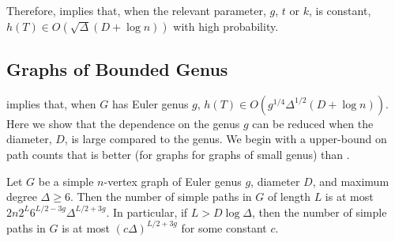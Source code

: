 \documentclass[lotsofwhite]{patmorin}
\begin{document}
Therefore,  implies that,
when the relevant parameter, $g$, $t$ or $k$, is constant, $h(T)\in
O(\sqrt{\Delta}(D+\log n))$ with high probability.  



\subsection{Graphs of Bounded Genus}

 implies that, when $G$ has Euler genus
$g$, $h(T)\in O(g^{1/4}\Delta^{1/2}(D+\log n))$.  Here we show that
the dependence on the genus $g$ can be reduced when the diameter, $D$,
is large compared to the genus.  We begin with a upper-bound on path
counts that is better (for graphs for graphs of small genus) than 
.

\begin{lem}
   Let $G$ be a simple $n$-vertex graph of Euler genus $g$, diameter
   $D$, and maximum degree $\Delta\ge 6$. Then the number of simple paths
   in $G$ of length $L$ is at most $2n2^{L}6^{L/2-3g}\Delta^{L/2+3g}$.
   In particular, if $L>D\log\Delta$, then the number of simple paths
   in $G$ is at most $(c\Delta)^{L/2+3g}$ for some constant $c$.
\end{lem}
\end{document}
